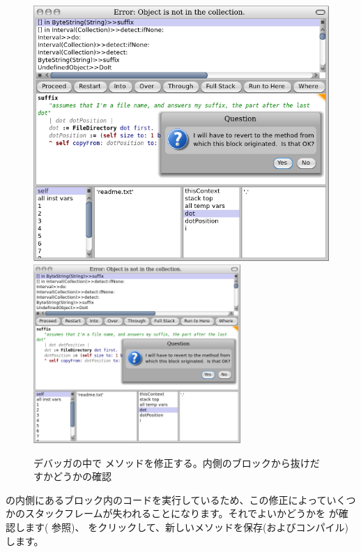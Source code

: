 \documentclass[a4paper,10pt,twoside]{book}
\begin{document}
\begin{figure}[btp]
\begin{center}
\ifluluelse
{\includegraphics[width=\textwidth]{revertDialog}}
{\includegraphics[width=0.7\textwidth]{revertDialog}}
\end{center}
\caption{デバッガの中で  メソッドを修正する。内側のブロックから抜けだすかどうかの確認}
\end{figure}


 の内側にあるブロック内のコードを実行しているため、この修正によっていくつかのスタックフレームが失われることになります。それでよいかどうかを \pharo が確認します(  参照)、 をクリックして、新しいメソッドを保存(およびコンパイル)します。
\end{document}
